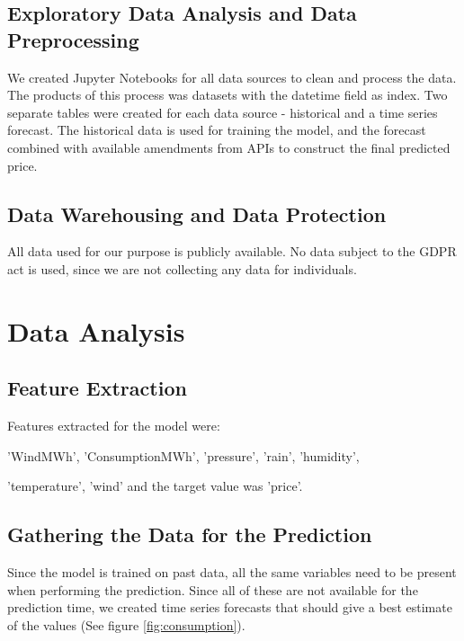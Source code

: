 \documentclass{article}
\begin{document}
\subsection{Exploratory Data Analysis and Data Preprocessing}
\label{subsection:eda}

We created Jupyter Notebooks for all data sources to clean and process the data. The products of this process was datasets with the datetime field as index. Two separate tables were created for each data source - historical and a time series forecast. The historical data is used for training the model, and the forecast combined with available amendments from APIs to construct the final predicted price.

\subsection{Data Warehousing and Data Protection}
\label{subsection:wareousing}

All data used for our purpose is publicly available. No data subject to the GDPR act is used, since we are not collecting any data for individuals.

\section{Data Analysis}
\label{section:analysis}

\subsection{Feature Extraction}
\label{subsection:extraction}

Features extracted for the model were:

'WindMWh', 'ConsumptionMWh', 'pressure', 'rain', 'humidity',

'temperature', 'wind' and the target value was 'price'.


\subsection{Gathering the Data for the Prediction}
\label{subsection:datafilling}

Since the model is trained on past data, all the same variables need to be present when performing the prediction. Since all of these are not available for the prediction time, we created time series forecasts that should give a best estimate of the values (See figure \ref{fig:consumption}).
\end{document}

